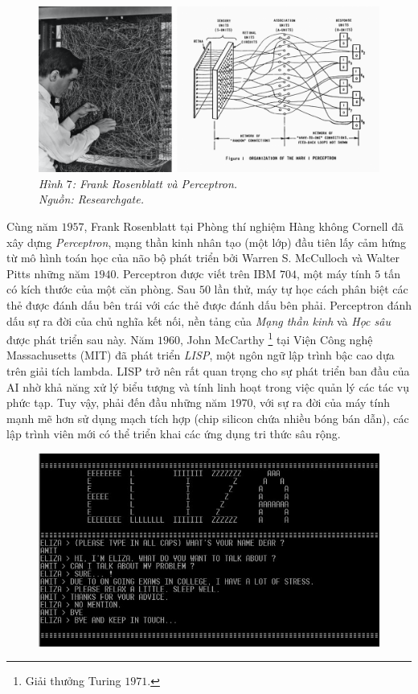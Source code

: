 \begin{multicols}{2}
	\begin{figure}[H]
		\vspace*{-5pt}
		\centering
		\captionsetup{labelformat= empty, justification=centering}
		\includegraphics[width= 1\linewidth]{perceptron_1.png}
		\caption{\small\textit{\color{timhieukhoahoc}Hình $7$: Frank Rosenblatt và Perceptron.\\ Nguồn: Researchgate.}}
		\vspace*{-10pt}
	\end{figure}
	Cùng năm $1957$, Frank Rosenblatt tại Phòng thí nghiệm Hàng không Cornell đã xây dựng \textit{Perceptron}, mạng thần kinh nhân tạo (một lớp) đầu tiên lấy cảm hứng từ mô hình toán học của não bộ phát triển bởi Warren S. McCulloch và Walter Pitts những năm $1940$. Perceptron được viết trên IBM $704$, một máy tính $5$ tấn có kích thước của một căn phòng. Sau $50$ lần thử, máy tự học cách phân biệt các thẻ được đánh dấu bên trái với các thẻ được đánh dấu bên phải. Perceptron đánh dấu sự ra đời của chủ nghĩa kết nối, nền tảng của \textit{Mạng thần kinh}  và \textit{Học sâu} được phát triển sau này.
	\vskip 0.1cm
	Năm $1960$, John McCarthy \footnote{\color{timhieukhoahoc}Giải thưởng Turing $1971$.} tại Viện Công nghệ Massachusetts (MIT) đã phát triển \textit{LISP}, một ngôn ngữ lập trình bậc cao dựa trên giải tích lambda. LISP trở nên rất quan trọng cho sự phát triển ban đầu của AI nhờ khả năng xử lý biểu tượng và tính linh hoạt trong việc quản lý các tác vụ phức tạp. Tuy vậy, phải đến đầu những năm $1970$, với sự ra đời của máy tính mạnh mẽ hơn sử dụng mạch tích hợp (chip silicon chứa nhiều bóng bán dẫn), các lập trình viên mới có thể triển khai các ứng dụng tri thức sâu rộng.
	\begin{figure}[H]
		\vspace*{-5pt}
		\centering
		\captionsetup{labelformat= empty, justification=centering}
		\includegraphics[width= 1\linewidth]{eliza.jpeg}

\end{figure}
\end{multicols}
